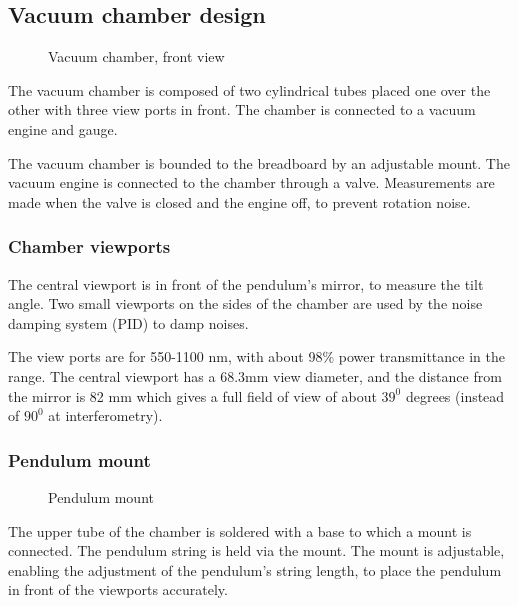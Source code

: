 \documentclass[\main/master.tex]{subfiles}
\begin{document}
\subsection{Vacuum chamber design}
\begin{figure}[htbp]
	\centering
	\caption[Vacuum chamber, front view]{Vacuum chamber, front view}
	\label{fig:chamber front}
\end{figure}
\FloatBarrier

\par\noindent
The vacuum chamber is composed of two cylindrical tubes placed one over the other with three view ports in front. The chamber is connected to a vacuum engine and gauge.
\par\noindent
The vacuum chamber is bounded to the breadboard by an adjustable mount. The vacuum engine is connected to the chamber through a valve. Measurements are made when the valve is closed and the engine off, to prevent rotation noise.

\subsubsection{Chamber viewports}
\par\noindent
The central viewport is in front of the pendulum's mirror, to measure the tilt angle. Two small viewports on the sides of the chamber are used by the noise damping system (PID) to damp noises. 
\par\noindent
The view ports are for 550-1100 nm, with about 98$\%$ power transmittance in the range. The central viewport has a 68.3mm view diameter, and the distance from the mirror is 82 mm which gives a full field of view of about $39^0$ degrees (instead of $90^0$ at interferometry).

\subsubsection{Pendulum mount}
\begin{figure}[htbp]
	\centering
	\caption[Pendulum mount]{Pendulum mount}
	\label{fig:mount}
\end{figure}
\FloatBarrier
\par\noindent
The upper tube of the chamber is soldered with a base to which a mount is connected. The pendulum string is held via the mount. The mount is adjustable, enabling the adjustment of the pendulum's string length, to place the pendulum in front of the viewports accurately. 
\end{document}
